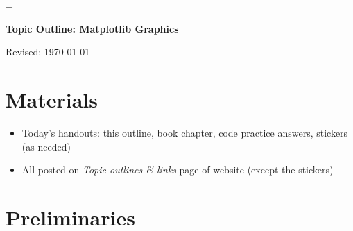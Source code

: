 \documentclass[11pt]{article}
\begin{document}
\parskip=\bigskipamount
\parindent=0.0in
\thispagestyle{empty}


\bigskip\bigskip
\centerline{\Large \bf Topic Outline:  Matplotlib Graphics}
\centerline{Revised: \today}

\section*{Materials}

\begin{itemize}
\item  Today's handouts:  this outline, book chapter, code practice answers, stickers (as needed)
\item  All posted on {\it Topic outlines \& links\/} page of website (except the stickers)
\end{itemize}

\section*{Preliminaries}
\end{document}
